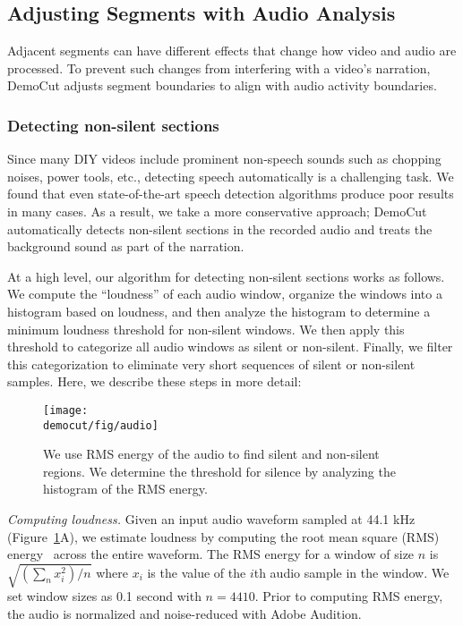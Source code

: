 \subsection{Adjusting Segments with Audio Analysis}

Adjacent segments can have different effects that change how video and audio are processed. To prevent such changes from interfering with a video's narration, DemoCut adjusts segment boundaries to align with audio activity boundaries.

\subsubsection{Detecting non-silent sections}
%
Since many DIY videos include prominent non-speech sounds such as
chopping noises, power tools, etc., detecting speech automatically is
a challenging task. We found that even state-of-the-art speech
detection algorithms produce poor results in many cases.
%
As a result, we take a more conservative approach; DemoCut
automatically detects non-silent sections in the recorded
audio and treats the background sound as part of the narration.

At a high level, our algorithm for detecting non-silent sections works
as follows. We compute the ``loudness'' of each audio window,
organize the windows into a histogram based on loudness, and then
analyze the histogram to determine a minimum loudness threshold for
non-silent windows. We then apply this threshold to categorize all
audio windows as silent or non-silent. Finally, we filter this
categorization to eliminate very short sequences of silent or non-silent samples. Here, we describe these steps in more detail:

\begin{figure}[t]
  \centering
\texttt{[image: \\democut/fig/audio]}
  \caption{We use RMS energy of the audio to find silent and non-silent regions. We determine the threshold for silence by analyzing the histogram of the RMS energy.}
  \label{fig:audio}
\end{figure}

\emph{Computing loudness.} Given an input audio waveform sampled at
44.1 kHz (Figure~\ref{fig:audio}A), we estimate loudness by computing
the root mean square (RMS) energy~\cite{Panagiotakis:2005eb} across
the entire waveform. The RMS energy
for a window of size $n$ is $\sqrt{(\sum_{n}{x_i^2})/n}$ where $x_i$ is the value of
the $i$th audio sample in the window. We set window sizes as 0.1 second with $n = 4410$. Prior to computing RMS energy, the audio is normalized and noise-reduced with Adobe Audition.

